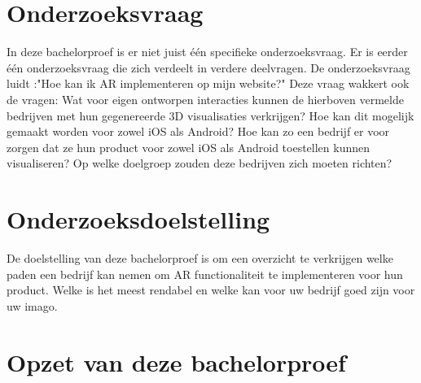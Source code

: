 
\section{Onderzoeksvraag}
\label{sec:onderzoeksvraag}


In deze bachelorproef is er niet juist één specifieke onderzoeksvraag. Er is eerder één onderzoeksvraag die zich verdeelt in verdere deelvragen. De onderzoeksvraag luidt :"Hoe kan ik AR implementeren op mijn website?" Deze vraag wakkert ook de vragen: Wat voor eigen ontworpen interacties kunnen de hierboven vermelde bedrijven met hun gegenereerde 3D visualisaties verkrijgen? Hoe kan dit mogelijk gemaakt worden voor zowel iOS als Android? Hoe kan zo een bedrijf er voor zorgen dat ze hun product voor zowel iOS als Android toestellen kunnen visualiseren? Op welke doelgroep zouden deze bedrijven zich moeten richten?


\section{Onderzoeksdoelstelling}
\label{sec:onderzoeksdoelstelling}

De doelstelling van deze bachelorproef is om een overzicht te verkrijgen welke paden een bedrijf kan nemen om AR functionaliteit te implementeren voor hun product. Welke is het meest rendabel en welke kan voor uw bedrijf goed zijn voor uw imago. 

\section{Opzet van deze bachelorproef}
\label{sec:opzet-bachelorproef}

